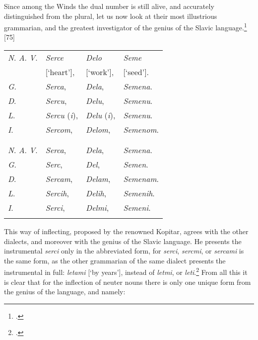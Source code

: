 Since among the Winds the dual number is still alive, and accurately distinguished from the plural, let us now look at their most illustrious grammarian, and the greatest investigator of the genius of the Slavic language.{\enlargethispage{\baselineskip}\footnote{\citet[237 (\textit{serza}, \textit{délo}), 240--241 (\textit{séme})]{kopitar_grammatik_1808}.}} [75]

\begin{longtable}{ l l l l }
    \lsptoprule
    \multicolumn{4}{ c }{Singular.} \\
    \midrule
    \textit{N}. \textit{A}. \textit{V}. & \textit{Serce} & \textit{Delo} & \textit{Seme} \\
    & [‘heart’], & [‘work’], & [‘seed’]. \\
    \textit{G}. & \textit{Serca}, & \textit{Dela}, & \textit{Semena}. \\
    \textit{D}. & \textit{Sercu}, & \textit{Delu}, & \textit{Semenu}. \\ 
    \textit{L}. & \textit{Sercu} (\textit{i}), & \textit{Delu} (\textit{i}), & \textit{Semenu}. \\
    \textit{I}. & \textit{Sercom}, & \textit{Delom}, & \textit{Semenom}. \\
    \lspbottomrule
    \\
    \lsptoprule
    \multicolumn{4}{ c }{Plural.} \\
    \midrule
    \textit{N}. \textit{A}. \textit{V}. & \textit{Serca}, & \textit{Dela}, & \textit{Semena}. \\
    \textit{G}. & \textit{Serc}, & \textit{Del}, & \textit{Semen}. \\
    \textit{D}. & \textit{Sercam}, & \textit{Delam}, & \textit{Semenam}. \\
    \textit{L}. & \textit{Sercih}, & \textit{Delih}, & \textit{Semenih}. \\
    \textit{I}. & \textit{Serci}, & \textit{Delmi}, & \textit{Semeni}. \\
    \lspbottomrule
\end{longtable}

This way of inflecting, proposed by the renowned Kopitar, agrees with the other dialects, and moreover with the genius of the Slavic language. He presents the instrumental \textit{serci} only in the abbreviated form, for \textit{serci}, \textit{sercmi}, or \textit{sercami} is the same form, as the other grammarian of the same dialect presents the instrumental in full: \textit{letami} [‘by years’], instead of \textit{letmi}, or \textit{leti}.\footnote{\citet[151]{dainko_lehrbuch_1824}.} From all this it is clear that for the inflection of neuter nouns there is only one unique form from the genius of the language, and namely: 

